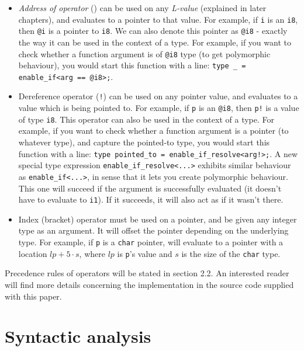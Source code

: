 \documentclass[times, utf8, diplomski]{fer}
\theoremstyle{definition}
\begin{document}
\begin{itemize}
    \item \textit{Address of operator} () can be used on any \textit{L-value} (explained
        in later chapters), and evaluates to a pointer to that value. For
        example, if \texttt{i} is an \texttt{i8}, then \texttt{@i} is a pointer
    to \texttt{i8}. We can also denote this pointer as \texttt{@i8} - exactly the way it can be used in 
    the context of a type. For example, if you want to check whether a function argument is of \texttt{@i8}
    type (to get polymorphic behaviour), you would start this function with a line:
    \texttt{type \_ = enable\_if<arg == @i8>;}.

    \item Dereference operator (\texttt{!}) can be used on any pointer value, 
        and evaluates to a value which is being pointed to.
        For example, if \texttt{p} is an \texttt{@i8}, then \texttt{p!} is a value of type \texttt{i8}.
    This operator can also be used in the context of a type.
    For example, if you want to check whether a function argument is a pointer (to whatever type), 
    and capture the pointed-to type, you would start this function with a line:
    \texttt{type pointed\_to = enable\_if\_resolve<arg!>;}.
    A new special type expression \texttt{enable\_if\_resolve<...>} exhibits similar behaviour as
    \texttt{enable\_if<...>}, in sense that it lets you create polymorphic behaviour. This one will
    succeed if the argument is successfully evaluated (it doesn't have to evaluate to \texttt{i1}).
    If it succeeds, it will also act as if it wasn't there.


    \item Index (bracket) operator must be used on a pointer, and be given any integer type as an argument.
        It will offset the pointer depending on the underlying type. For example, 
        if \texttt{p} is a \texttt{char} pointer,  will evaluate to a pointer 
        with a location $lp+5\cdot s$, where $lp$ is \texttt{p}'s value and $s$ is the size 
        of the \texttt{char} type.
\end{itemize}

Precedence rules of operators will be stated in section 2.2. 
An interested reader will find more details concerning the implementation in
the source code supplied with this paper.

\section{Syntactic analysis}
\end{document}
